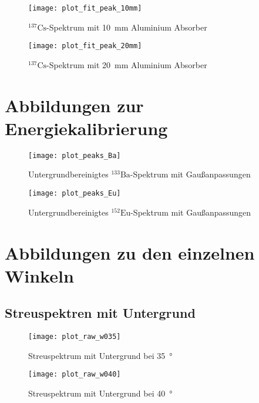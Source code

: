 \documentclass[11pt, ngerman, fleqn, DIV=15, headinclude, BCOR=2cm]{scrreprt}
\begin{document}
\begin{appendix}
\begin{figure}[h]
    \centering
    \texttt{[image: plot\_fit\_peak\_10mm]}
    \caption{%
	    $^{137}\text{Cs}$-Spektrum mit \SI{10}{\milli\metre} Aluminium
	    Absorber
   }
    \label{fig:plot_fit_peak_10mm}
\end{figure}

\begin{figure}[h]
    \centering
    \texttt{[image: plot\_fit\_peak\_20mm]}
    \caption{%
	    $^{137}\text{Cs}$-Spektrum mit \SI{20}{\milli\metre} Aluminium
	    Absorber
   }
    \label{fig:plot_fit_peak_20mm}
\end{figure}

\clearpage

\section{Abbildungen zur Energiekalibrierung} \label{anhang-energiekalibrierung}
\begin{figure}[h]
    \centering
    \texttt{[image: plot\_peaks\_Ba]}
    \caption{%
	    Untergrundbereinigtes $^{133}\text{Ba}$-Spektrum mit
	    Gaußanpassungen
   }
    \label{fig:plot_peaks_Ba}
\end{figure}

\begin{figure}[h]
    \centering
    \texttt{[image: plot\_peaks\_Eu]}
    \caption{%
	    Untergrundbereinigtes $^{152}\text{Eu}$-Spektrum mit
	    Gaußanpassungen
    }
    \label{fig:plot_peaks_Eu}
\end{figure}

\clearpage

\section{Abbildungen zu den einzelnen Winkeln}\label{anhang-streuspektren}
\subsection{Streuspektren mit Untergrund}
\label{anhang-streuspektren-untergrund}
\begin{figure}[h]
    \centering
    \texttt{[image: plot\_raw\_w035]}
    \caption{%
	    Streuspektrum mit Untergrund bei \SI{35}{\degree}
    }
    \label{fig:plot_raw_w035}
\end{figure}

\begin{figure}[h]
    \centering
    \texttt{[image: plot\_raw\_w040]}
    \caption{%
	    Streuspektrum mit Untergrund bei \SI{40}{\degree}
    }
    \label{fig:plot_raw_w040}
\end{figure}


\end{appendix}
\end{document}
